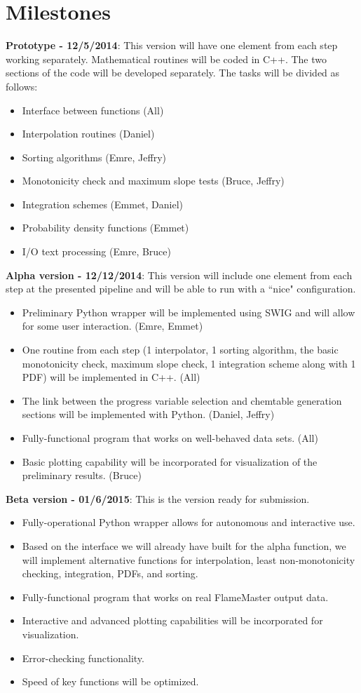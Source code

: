 \documentclass[11pt]{article}
\begin{document}
\section{Milestones}
\textbf{Prototype - 12/5/2014}: This version will have one element from each step working separately. Mathematical routines will be coded in C++. The two sections of the code will be developed separately. The tasks will be divided as follows:
\begin{itemize}
\item Interface between functions (All)
\item Interpolation routines (Daniel)
\item Sorting algorithms (Emre, Jeffry)
\item Monotonicity check and maximum slope tests (Bruce, Jeffry)
\item Integration schemes (Emmet, Daniel)
\item Probability density functions (Emmet)
\item I/O text processing (Emre, Bruce)
\end{itemize}

\noindent\textbf{Alpha version - 12/12/2014}: This version will include one element from each step at the presented pipeline and will be able to run with a ``nice" configuration.
\begin{itemize}
\item Preliminary Python wrapper will be implemented using SWIG and will allow for some user interaction. (Emre, Emmet) 
\item One routine from each step (1 interpolator, 1 sorting algorithm, the basic monotonicity check, maximum slope check, 1 integration scheme along with 1 PDF) will be implemented in C++. (All)
\item The link between the progress variable selection and chemtable generation sections will be implemented with Python. (Daniel, Jeffry)
\item Fully-functional program that works on well-behaved data sets. (All)
\item Basic plotting capability will be incorporated for visualization of the preliminary results.  (Bruce)
\end{itemize}

\noindent\textbf{Beta version - 01/6/2015}: This is the version ready for submission.
\begin{itemize}
\item Fully-operational Python wrapper allows for autonomous and interactive use.
\item Based on the interface we will already have built for the alpha function, we will implement alternative functions for interpolation, least non-monotonicity checking, integration, PDFs, and sorting.
\item Fully-functional program that works on real FlameMaster output data.
\item Interactive and advanced plotting capabilities will be incorporated for visualization.
\item Error-checking functionality.
\item Speed of key functions will be optimized.
\end{itemize}
\end{document}
